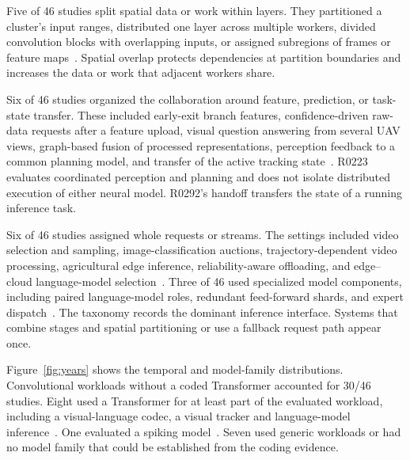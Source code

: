 \documentclass[pdflatex,sn-vancouver-num]{sn-jnl}
\begin{document}
Five of 46 studies split spatial data or work within layers. They partitioned a cluster's input ranges, distributed one layer across multiple workers, divided convolution blocks with overlapping inputs, or assigned subregions of frames or feature maps~\cite{R0014,R0015,R0043,R0044,R0125}. Spatial overlap protects dependencies at partition boundaries and increases the data or work that adjacent workers share.

Six of 46 studies organized the collaboration around feature, prediction, or task-state transfer. These included early-exit branch features, confidence-driven raw-data requests after a feature upload, visual question answering from several UAV views, graph-based fusion of processed representations, perception feedback to a common planning model, and transfer of the active tracking state~\cite{R0075,R0080,R0107,R0113,R0223,R0292}. R0223 evaluates coordinated perception and planning and does not isolate distributed execution of either neural model. R0292's handoff transfers the state of a running inference task.

Six of 46 studies assigned whole requests or streams. The settings included video selection and sampling, image-classification auctions, trajectory-dependent video processing, agricultural edge inference, reliability-aware offloading, and edge--cloud language-model selection~\cite{R0036,R0058,R0064,R0090,R0137,R0145}. Three of 46 used specialized model components, including paired language-model roles, redundant feed-forward shards, and expert dispatch~\cite{R0063,R0110,R0118}. The taxonomy records the dominant inference interface. Systems that combine stages and spatial partitioning or use a fallback request path appear once.

Figure~\ref{fig:years} shows the temporal and model-family distributions. Convolutional workloads without a coded Transformer accounted for 30/46 studies. Eight used a Transformer for at least part of the evaluated workload, including a visual-language codec, a visual tracker and language-model inference~\cite{R0074,R0107,R0292}. One evaluated a spiking model~\cite{R0113}. Seven used generic workloads or had no model family that could be established from the coding evidence.
\end{document}
